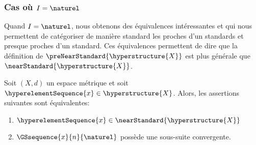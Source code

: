 \subsubsection*{Cas où $I = \naturel$}

Quand $I = \naturel$, nous obtenons des équivalences intéressantes et qui nous
permettent de catégoriser de manière \og standard \fg les proches d'un standards
et presque proches d'un standard. Ces
équivalences permettent de dire que la définition de
$\preNearStandard{\hyperstructure{X}}$ est plus générale que
$\nearStandard{\hyperstructure{X}}$.

\begin{proposition}
	\label{near_standard_subsequence_convergente}
	Soit $(X, d)$ un espace métrique et soit $\hyperelementSequence{x} \in
	\hyperstructure{X}$. Alors, les assertions suivantes sont équivalentes:

	\begin{enumerate}
	  \item $\hyperelementSequence{x} \in \nearStandard{\hyperstructure{X}}$
	  \item $\GSsequence{x}{n}{\naturel}$ possède une sous-suite convergente.
	\end{enumerate}
\end{proposition}

